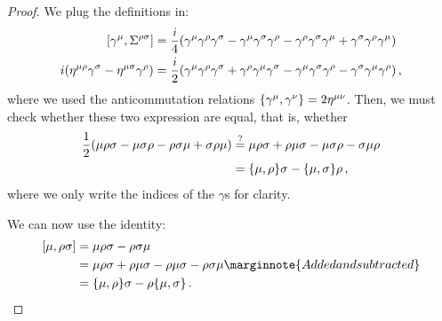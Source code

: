 \documentclass[main.tex]{subfiles}
\begin{document}
\begin{proof}
We plug the definitions in: 
%
\begin{subequations}
\begin{align}
\qty[\gamma^{\mu }, \Sigma^{\rho \sigma }] &= \frac{i}{4} \qty(\gamma^{\mu } \gamma^{\rho} \gamma^{\sigma } - \gamma^{\mu } \gamma^{\sigma } \gamma^{\rho } - \gamma^{ \rho } \gamma^{\sigma } \gamma^{\mu } + \gamma^{ \sigma } \gamma^{ \rho } \gamma^{ \mu })  \\
i \qty(\eta^{\mu \rho } \gamma^{\sigma } - \eta^{\mu \sigma } \gamma^{\rho }) &= \frac{i}{2} \qty(\gamma^{\mu} \gamma^{\rho } \gamma^{\sigma } + \gamma^{\rho } \gamma^{\mu } \gamma^{\sigma } -\gamma^{\mu } \gamma^{\sigma }\gamma^{\rho } - \gamma^{\sigma } \gamma^{\mu } \gamma^{ \rho } )
\,,
\end{align}
\end{subequations}
%
where we used the anticommutation relations \(\qty{\gamma^{\mu }, \gamma^{\nu }} = 2 \eta^{\mu \nu }\). 
Then, we must check whether these two expression are equal, that is, whether 
%
\begin{subequations}
\begin{align}
\frac{1}{2} \qty( \mu  \rho \sigma  - \mu  \sigma  \rho  -  \rho  \sigma  \mu  +  \sigma   \rho   \mu ) &\overset{?}{=} 
\mu \rho  \sigma  + \rho  \mu  \sigma  -\mu  \sigma \rho  - \sigma  \mu   \rho   \\
&=  \qty{\mu, \rho }\sigma - \qty{\mu , \sigma } \rho 
\,,
\end{align}
\end{subequations}
%
where we only write the indices of the \(\gamma \)s for clarity. 

We can now use the identity: 
%
\begin{subequations}
\begin{align}
[\mu , \rho \sigma ] &= \mu \rho \sigma - \rho \sigma \mu  \\
&= \mu \rho \sigma + \rho \mu \sigma - \rho \mu \sigma - \rho \sigma \mu \marginnote{Added and subtracted}  \\
&= \qty{\mu, \rho } \sigma - \rho \qty{\mu, \sigma }
\,.
\end{align}
\end{subequations}


\end{proof}
\end{document}
